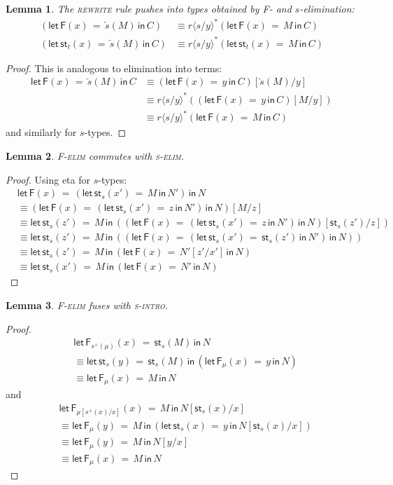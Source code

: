 \documentclass[10pt]{article}
\newtheorem{lemma}{Lemma}
\theoremstyle{definition}
\newcommand{\rewrite}[2]{\overleftarrow{#1}(#2)}
\newcommand\St[2]{\ensuremath{{#1}^*(#2)}}
\newcommand\StI[2]{\ensuremath{\mathsf{st}_{#1}(#2)}}
\newcommand\StE[4]{\ensuremath{\mathsf{let} \, \StI{#1}{#3} \, = \, {#2} \, \mathsf{in} \, #4}}
\newcommand\FE[3]{\ensuremath{\mathsf{let} \, \mathsf{F}(#2) \, = \, {#1} \, \mathsf{in} \, #3}}
\newcommand\FEs[4]{\ensuremath{\mathsf{let} \, \mathsf{F}_{#1}(#3) \, = \, {#2} \, \mathsf{in} \, #4}}
\newcommand\TrPlus[2]{\ensuremath{{#1}^+(#2)}}
\newcommand\ap[2]{\ensuremath{#1 \langle #2 \rangle }}
\begin{document}
\begin{lemma}
The \textsc{rewrite} rule pushes into types obtained by \textsf{F}- and $s$-elimination:
\begin{align*}
(\FE{\rewrite{s}{M}}{x}{C}) &\equiv \St{\ap{r}{s/y}}{\FE{M}{x}{C}} \\
(\StE{t}{\rewrite{s}{M}}{x}{C}) &\equiv \St{\ap{r}{s/y}}{\StE{t}{M}{x}{C}}
\end{align*}
\end{lemma}
\begin{proof}
This is analogous to elimination into terms:
\begin{align*}
\FE{\rewrite{s}{M}}{x}{C}
&\equiv (\FE{y}{x}{C})[\rewrite{s}{M}/y] \\
&\equiv \St{\ap{r}{s/y}}{(\FE{y}{x}{C})[M/y]} \\
&\equiv \St{\ap{r}{s/y}}{\FE{M}{x}{C}}
\end{align*}
and similarly for $s$-types.
\end{proof}

\begin{lemma}
\textsc{F-elim} commutes with \textsc{s-elim}.
\end{lemma}
\begin{proof}
Using eta for $s$-types:
\begin{align*}
&\FE{(\StE{s}{M}{x'}{N'})}{x}{N} \\
&\equiv (\FE{(\StE{s}{z}{x'}{N'})}{x}{N})[M/z] \\
&\equiv \StE{s}{M}{z'}{((\FE{(\StE{s}{z}{x'}{N'})}{x}{N})[\StI{s}{z'}/z])} \\
&\equiv \StE{s}{M}{z'}{((\FE{(\StE{s}{\StI{s}{z'}}{x'}{N'})}{x}{N}))} \\
&\equiv \StE{s}{M}{z'}{(\FE{N'[z'/x']}{x}{N})} \\
&\equiv \StE{s}{M}{x'}{(\FE{N'}{x}{N})}
\end{align*}
\end{proof}

\begin{lemma}
\textsc{F-elim} fuses with \textsc{s-intro}.
\end{lemma}
\begin{proof}
\begin{align*}
&\FEs{\TrPlus{s}{\mu}}{\StI{s}{M}}{x}{N} \\
&\equiv \StE{s}{\StI{s}{M}}{y}{(\FEs{\mu}{y}{x}{N})} \\
&\equiv \FEs{\mu}{M}{x}{N}
\end{align*}
and
\begin{align*}
& \FEs{\mu[\TrPlus{s}{x}/x]}{M}{x}{N[\StI{s}{x}/x]} \\
&\equiv \FEs{\mu}{M}{y}{(\StE{s}{y}{x}{N[\StI{s}{x}/x]})}  \\
&\equiv \FEs{\mu}{M}{y}{N[y/x]} \\
&\equiv \FEs{\mu}{M}{x}{N}
\end{align*}
\end{proof}
\end{document}
